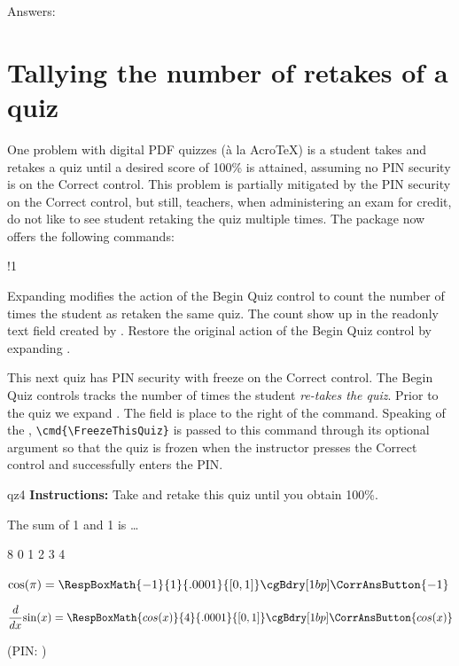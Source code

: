 \documentclass[10pt]{article}
\let\uif\textsf
\begin{document}
\noindent
Answers: \AnswerField\currQuiz

\section{Tallying the number of retakes of a quiz}

One problem with digital PDF quizzes (\`a la Acro\negthinspace\TeX) is a
student takes and retakes a quiz until a desired score of 100\% is attained,
assuming no PIN security is on the \uif{Correct} control. This problem is
partially mitigated by the PIN security on the \uif{Correct} control, but
still, teachers, when administering an exam for credit, do not like to see
student retaking the quiz multiple times. The  package now offers
the following commands:
\bVerb{}%
\def\1{\rlap{\sffamily\hskip\linewidth(optionally, use with \cs{usePINCorrBtn})}}
\begin{dCmd}[commandchars=!()]{\bxSize}
!1\useBeginQuizCnt
\restorBeginQuiz
{}
\end{dCmd}
\eVerb Expanding  modifies the action of the \uif{Begin
Quiz} control to count the number of times the student as retaken the same
quiz. The count show up in the readonly text field created by
. Restore the original action of the \uif{Begin Quiz} control
by expanding .

This next quiz has PIN security with freeze on the \uif{Correct} control. The
\uif{Begin Quiz} controls tracks the number of times the student
\emph{re-takes the quiz}. Prior to the quiz we expand
. The
 field is place to the right of the  command.
Speaking of the , \verb|\cmd{\FreezeThisQuiz}| is passed to
this command through its optional argument so that the quiz is frozen when
the instructor presses the \uif{Correct} control and successfully enters the
PIN.

\showScoreOn
\useBeginQuizPIN
\useBeginQuizCnt

\begin{quiz*}{qz4}
\textbf{Instructions:} Take and retake this quiz until you obtain 100\%.
\begin{questions}
    \item The sum of 1 and 1 is \dots
\begin{answers}{8}
\bChoices
   0\eAns
   1\eAns
   2\eAns
   3\eAns
   4\eAns
\eChoices
\end{answers}
  \item $ \cos(\pi) = \RespBoxMath{-1}{1}{.0001}{[0,1]}\cgBdry[1bp]
\CorrAnsButton{-1} $

\item $\displaystyle\frac{d}{dx}{\sin(x)}=\RespBoxMath{cos(x)}{4}{.0001}{[0,1]}\cgBdry[1bp]
\CorrAnsButton{cos(x)} $
\end{questions}
\end{quiz*}\quad\ScoreField[\rectW{2.25in}]\currQuiz\olBdry\CorrButton[\cmd{\FreezeThisQuiz}]{\currQuiz} (PIN: \numPINId)\hfill\qzResetTally
\end{document}

